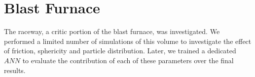 
\chapter{Blast Furnace}
\label{cap:blastfurnace}

The raceway, a critic portion of the blast furnace, was investigated. We
performed a limited number of simulations of this volume to investigate the
effect of friction, sphericity and particle distribution.
Later, we trained a dedicated $ANN$ to evaluate the contribution of each of
these parameters over the final results.

